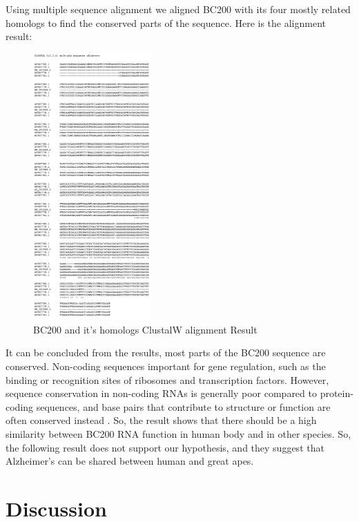 \documentclass[conference, 11pt]{IEEEtran}
\begin{document}
Using multiple sequence alignment we aligned BC200 with its four mostly related homologs to find the conserved parts of the sequence.
Here is the alignment result:

\begin{figure}[h]
  \centering
  \includegraphics[width=0.4\textwidth]{figs/alignment.png}
  \caption{BC200 and it's homologs ClustalW alignment Result}
  \label{fig:alignment result}
\end{figure}

It can be concluded from the results, most parts of the BC200 sequence are conserved. 
Non-coding sequences important for gene regulation, such as the binding or recognition sites of ribosomes and transcription factors. 
However, sequence conservation in non-coding RNAs is generally poor compared to protein-coding sequences, and base pairs that contribute to structure or function are often conserved instead \cite{johnsson2014evolutionary}. 
So, the result shows that there should be a high similarity between BC200 RNA function in human body and in other species. 
So, the following result does not support our hypothesis, and they suggest that Alzheimer’s can be shared between human and great apes.

\section{Discussion}\label{sec:discussion}
\end{document}
